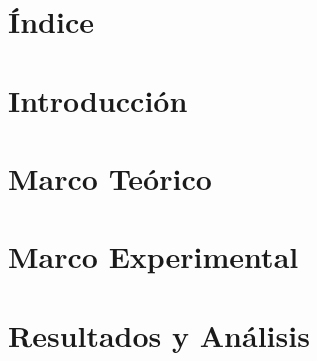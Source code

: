 \documentclass[11pt, oneside]{book}
\begin{document}
\newpage{\ }
\thispagestyle{empty}

\chapter*{Índice}
\renewcommand{\contentsname}{}

\tableofcontents
\newpage{\ }
\thispagestyle{empty}

\mainmatter

\chapter{Introducción}


\chapter{Marco Teórico}


\chapter{Marco Experimental}


\chapter{Resultados y Análisis}


\backmatter
\renewcommand\bibname{Referencias}


\end{document}

